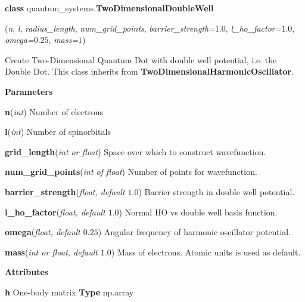 
\begin{tcolorbox}
    {\selectfont
    \textbf{class} quantum\_systems.\textbf{TwoDimensionalDoubleWell}

    \hspace{1em}(\emph{n}, \emph{l}, \emph{radius\_length}, \emph{num\_grid\_points}, 
    \emph{barrier\_strength=}$1.0$, \emph{l\_ho\_factor=$1.0$}, 
    \emph{omega=$0.25$}, \emph{mass=$1$})

    \vspace{1em}
    Create Two-Dimensional Quantum Dot with double well potential, i.e. the Double Dot.
    This class inherits from \textbf{TwoDimensionalHarmonicOscillator}.
    \vspace{1em}

    \textbf{Parameters}

    \hspace{2em}\textbf{n}(\emph{int}) Number of electrons
    
    \hspace{2em}\textbf{l}(\emph{int}) Number of spinorbitals
    
    \hspace{2em}\textbf{grid\_length}(\emph{int or float}) Space over which to 
        construct wavefunction.
    
    \hspace{2em}\textbf{num\_grid\_points}(\emph{int of float}) Number of 
        points for wavefunction.

    \hspace{2em}\textbf{barrier\_strength}(\emph{float, default $1.0$}) Barrier strength 
        in double well potential.
    
    \hspace{2em}\textbf{l\_ho\_factor}(\emph{float, default $1.0$}) Normal HO vs double
        well basis function.

    \hspace{2em}\textbf{omega}(\emph{float, default $0.25$}) Angular frequency of
        harmonic oscillator potential.
    
    \hspace{2em}\textbf{mass}(\emph{int or float, default $1.0$}) Mass of electrons.
        Atomic units is used as default.

    \vspace{1em}
    \textbf{Attributes}

    \hspace{2em} \textbf{h}
    One-body matrix 
    \textbf{Type} np.array
    
}
\end{tcolorbox}
